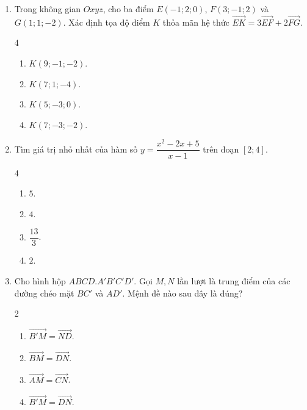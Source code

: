 \documentclass[12pt]{article}
\begin{document}
\begin{enumerate}[label=\textbf{Câu \arabic*.}, leftmargin=*]
		\item Trong không gian $Oxyz$, cho ba điểm $E(-1; 2; 0)$, $F(3; -1; 2)$ và $G(1; 1; -2)$. Xác định tọa độ điểm $K$ thỏa mãn hệ thức $\overrightarrow{EK} = 3\overrightarrow{EF} + 2\overrightarrow{FG}$.
		\begin{multicols}{4}
			\begin{enumerate}[label=\Alph*.]
				\item $K(9; -1; -2)$.
				\item $K(7; 1; -4)$.
				\item $K(5; -3; 0)$.
				\item $K(7; -3; -2)$.
			\end{enumerate}
		\end{multicols}
		
		\item Tìm giá trị nhỏ nhất của hàm số $y = \dfrac{x^2 - 2x + 5}{x - 1}$ trên đoạn $[2; 4]$.
		\begin{multicols}{4}
			\begin{enumerate}[label=\Alph*.]
				\item $5$.
				\item $4$.
				\item $\dfrac{13}{3}$.
				\item $2$.
			\end{enumerate}
		\end{multicols}
		
		\item Cho hình hộp $ABCD.A'B'C'D'$. Gọi $M, N$ lần lượt là trung điểm của các đường chéo mặt $BC'$ và $AD'$. Mệnh đề nào sau đây là đúng?
		\begin{multicols}{2}
			\begin{enumerate}[label=\Alph*.]
				\item $\overrightarrow{B'M} = \overrightarrow{ND}$.
				\item $\overrightarrow{BM} = \overrightarrow{DN}$.
				\item $\overrightarrow{AM} = \overrightarrow{CN}$.
				\item $\overrightarrow{B'M} = \overrightarrow{DN}$.
			\end{enumerate}
		\end{multicols}
		

\end{enumerate}
\end{document}
